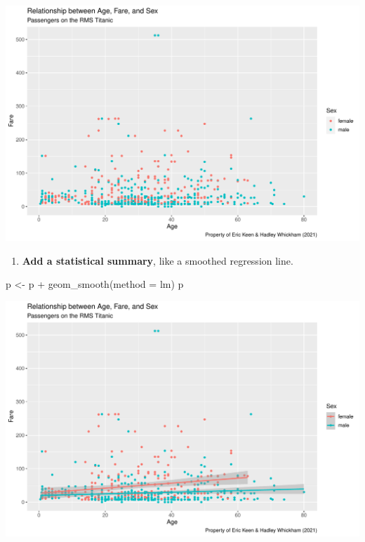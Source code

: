 \documentclass[
]{book}
\newenvironment{Shaded}{\begin{snugshade}}{\end{snugshade}}
\newcommand{\AttributeTok}[1]{\textcolor[rgb]{0.77,0.63,0.00}{#1}}
\newcommand{\FunctionTok}[1]{\textcolor[rgb]{0.00,0.00,0.00}{#1}}
\newcommand{\NormalTok}[1]{#1}
\newcommand{\OtherTok}[1]{\textcolor[rgb]{0.56,0.35,0.01}{#1}}
\newcommand{\SpecialCharTok}[1]{\textcolor[rgb]{0.00,0.00,0.00}{#1}}
\newcommand{\StringTok}[1]{\textcolor[rgb]{0.31,0.60,0.02}{#1}}
\providecommand{\tightlist}{%
  \setlength{\itemsep}{0pt}\setlength{\parskip}{0pt}}
\begin{document}
\includegraphics[width=694.08px]{figures/unnamed-chunk-161-1}

\begin{enumerate}
\def\labelenumi{(\arabic{enumi})}
\setcounter{enumi}{5}
\tightlist
\item
  \textbf{Add a statistical summary}, like a smoothed regression line.
\end{enumerate}

\begin{Shaded}
\begin{Highlighting}[]
\NormalTok{p }\OtherTok{\textless{}{-}}\NormalTok{ p }\SpecialCharTok{+} \FunctionTok{geom\_smooth}\NormalTok{(}\AttributeTok{method =} \StringTok{\textquotesingle{}lm\textquotesingle{}}\NormalTok{)}
\NormalTok{p}
\end{Highlighting}
\end{Shaded}

\includegraphics[width=694.08px]{figures/unnamed-chunk-162-1}
\end{document}

